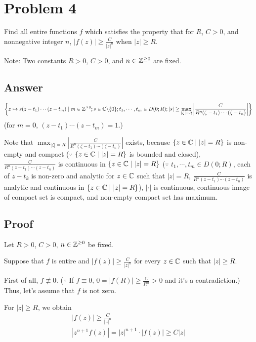 \section*{Problem 4}

Find all entire functions \(f\) which satisfies the property that for \(R\),
\(C > 0\), and nonnegative integer \(n\),
\(\left|f(z)\right| \ge \frac{C}{\left|z\right|^n}\)
when \(\left|z\right| \ge R\).

Note: Two constants \(R > 0\), \(C > 0\), and \(n \in \mathbb{Z}^{\ge 0}\) are fixed.

\subsection*{Answer}
\[
  \left\{
  z \mapsto s(z - t_1) \cdots (z - t_m)
  \mid
  m \in \bbZ^{\ge 0};
  s \in \bbC \bs \{0\};
  t_1, \cdots, t_m \in D(0; R);
  |s| \ge \max_{|\zeta| = R} \left| \frac{C}{R^n (\zeta - t_1) \cdots (\zeta - t_n)} \right|
  \right\}
\]
(for \(m = 0\), \((z - t_1) \cdots (z - t_m) = 1\).)

Note that
\(\max_{|\zeta| = R} \left| \frac{C}{R^n (\zeta - t_1) \cdots (\zeta - t_n)} \right|\)
exists, because \(\{z \in \mathbb{C} \mid |z| = R\}\) is non-empty and compact
(\(\because\) \(\{z \in \mathbb{C} \mid |z| = R\}\) is bounded and closed),
\(\frac{C}{R^n (z - t_1) \cdots (z - t_n)}\) is continuous in \(\{z \in \mathbb{C} \mid |z| = R\}\)
(\(\because\) \(t_1, \cdots, t_m \in D(0; R)\), each of \(z - t_k\) is non-zero and analytic for \(z \in \mathbb{C}\) such that \(|z| = R\), \(\frac{C}{R^n (z - t_1) \cdots (z - t_n)}\) is analytic and continuous in \(\{z \in \mathbb{C} \mid |z| = R\}\)), \(|\cdot|\) is continuous, continuous image of compact set is compact, and non-empty compact set has maximum.

\subsection*{Proof}
Let \(R > 0\), \(C > 0\), \(n \in \mathbb{Z}^{\ge 0}\) be fixed.
\newline

\noindent
Suppose that \(f\) is entire and \(|f(z)| \ge \frac{C}{|z|^n}\) for every \(z \in \mathbb{C}\) such that \(|z| \ge R\).

First of all, \(f \not\equiv 0\).
(\(\because\) If \(f \equiv 0\), \(0 = |f(R)| \ge \frac{C}{R^n} > 0\) and it's a contradiction.)
Thus, let's assume that \(f\) is not zero.

For \(|z| \ge R\), we obtain
\begin{gather*}
  |f(z)| \ge \frac{C}{|z|^n} \\
  |z^{n + 1} f(z)| = |z|^{n + 1} \cdot |f(z)| \ge C |z|
\end{gather*}

